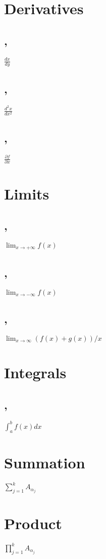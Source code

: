 \section*{Derivatives}

\subsection*{,}
$\frac{dx}{dy}$

\subsection*{,}
$\frac{d^2x}{dx^2}$

\subsection*{,}
$\frac{\partial f}{\partial x}$

\section*{Limits}

\subsection*{,}
$\lim_{x \to +\infty} f(x)$

\subsection*{,}
$\lim_{x \to -\infty} f(x)$

\subsection*{,}
$\lim_{x \to \infty} ( f(x) + g(x) )/x$

\section*{Integrals}
\subsection*{,}
$\int_{a}^b f(x)dx$


\section*{Summation}

$\sum_{j=1}^k A_{\alpha_j}$




\section*{Product}
$\prod_{j=1}^k A_{\alpha_j}$

